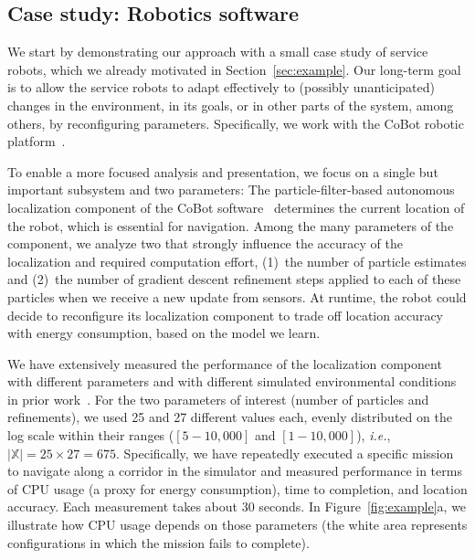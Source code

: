 \subsection{Case study: Robotics software}
\label{sec:case-study}
We start by demonstrating our approach with a small case
study of service robots, which we already motivated in Section~\ref{sec:example}.
Our long-term goal is to allow the service robots to adapt
effectively to (possibly unanticipated) changes in the environment, in
its goals, or in other parts of the system, among others, by reconfiguring
parameters. Specifically, we work with the CoBot robotic platform~\cite{veloso2015cobots}.

To enable a more focused analysis and presentation, we focus
on a single but important subsystem and two parameters:
The particle-filter-based autonomous localization component of the CoBot software~\cite{biswas2013localization}
determines the current location of the robot, which is essential for navigation.
Among the many parameters of the component, we analyze two that strongly
influence the accuracy of the localization and required computation effort,
(1)~the number of particle estimates and (2)~the number of gradient descent refinement
steps applied to each of these particles when we receive a new update from sensors.
At runtime, the robot could decide to reconfigure its localization
component to trade off location accuracy with energy consumption,
based on the model we learn.

We have extensively measured the performance of the localization
component with different parameters and with different simulated
environmental conditions in prior work~\cite{kawthekarsensitivity}.
For the two parameters of interest (number of particles and refinements), we used 25 and 27 different values
each, evenly distributed on the log scale within their ranges ($[5-10,000]$ and $[1-10,000]$),
\emph{i.e.}, $|\mathbb{X}|=25\times 27=675$.
Specifically, we have repeatedly executed a specific mission to navigate along
a corridor in the simulator and measured performance in terms of CPU
usage (a proxy for energy consumption), time to completion, and location accuracy.
Each measurement takes about 30 seconds. In Figure~\ref{fig:example}a, we illustrate how CPU usage depends on those parameters
(the white area represents configurations in which the mission fails to complete).

